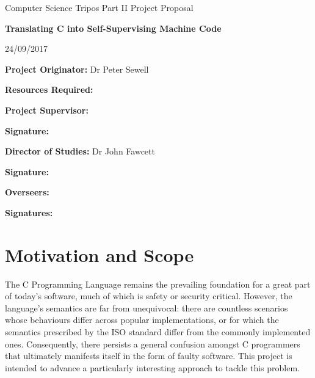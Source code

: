 \documentclass[12pt]{article}
\begin{document}
\thispagestyle{empty}

\medskip
{}

\vfil

\centerline{Computer Science Tripos Part II Project Proposal}
\vspace{0.4in}
\centerline{\large\bf Translating C into Self-Supervising Machine Code }
\vspace{0.3in}
\centerline{24/09/2017}

\vfil

{\bf Project Originator:} Dr Peter Sewell

\vspace{0.1in}

{\bf Resources Required:} 

\vspace{0.5in}

{\bf Project Supervisor:} 

\vspace{0.2in}

{\bf Signature:}

\vspace{0.5in}

{\bf Director of Studies:} Dr John Fawcett

\vspace{0.2in}

{\bf Signature:}

\vspace{0.5in}

{\bf Overseers:} 

\vspace{0.2in}

{\bf Signatures:} 

\vfil
\eject


\section{Motivation and Scope}

The C Programming Language remains the prevailing foundation for a great part of today's software, much of which is safety or security critical. However, the language's semantics are far from unequivocal: there are countless scenarios whose behaviours differ across popular implementations, or for which the semantics prescribed by the ISO standard differ from the commonly implemented ones. Consequently, there persists a general confusion amongst C programmers that ultimately manifests itself in the form of faulty software. This project is intended to advance a particularly interesting approach to tackle this problem. 
\end{document}
